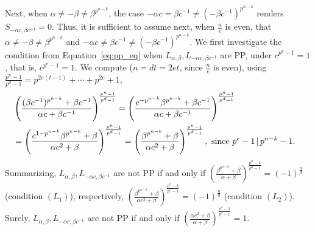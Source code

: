\documentclass[11pt]{article}
\def\\{\cr}
\begin{document}
Next, when $\alpha\neq -\beta\neq \beta^{p^{n-k}}$, the case $-\alpha c=\beta c^{-1}\neq (-\beta c^{-1})^{p^{n-k}}$ renders $S_{-\alpha c,\beta c^{-1}} =0$. Thus, it is sufficient to assume next, when $\frac{n}{e}$ is even, that $\alpha\neq -\beta\neq \beta^{p^{n-k}}$ and $-\alpha c\neq \beta c^{-1}\neq (-\beta c^{-1})^{p^{n-k}}$.
We first investigate the condition from Equation~\eqref{eq:pp_eq} when $L_{\alpha,\beta}, L_{-\alpha c,\beta c^{-1}}$ are PP, under $c^{p^k-1}=1$, that is, $c^{p^e-1}=1$.
We compute ($n=dt=2et$, since $\frac{n}{e}$ is even), using $\frac{p^n-1}{p^d-1}=p^{2e(t-1)}+\cdots+p^{2e}+1$,
\begin{align*}
&\left(\frac{(\beta c^{-1})^{p^{n-k}} +\beta c^{-1}}{\alpha c+\beta c^{-1}}  \right)^{\frac{p^n-1}{p^d-1}}
=\left(\frac{ c^{-p^{n-k}} \beta^{p^{n-k}} +\beta c^{-1}}{\alpha c+\beta c^{-1}}  \right)^{\frac{p^n-1}{p^d-1}}\\
&=\left(\frac{ c^{1-p^{n-k}} \beta^{p^{n-k}} +\beta }{\alpha c^2+\beta }  \right)^{\frac{p^n-1}{p^d-1}}
= \left(\frac{ \beta^{p^{n-k}} +\beta }{\alpha c^2+\beta }  \right)^{\frac{p^n-1}{p^d-1}},\text{ since } p^e-1\,|\,p^{n-k}-1.
\end{align*}
Summarizing, $L_{\alpha,\beta},L_{-\alpha c,\beta c^{-1}}$ are not PP if and only if  $\left(\frac{ \beta^{p^{n-k}} +\beta }{\alpha +\beta }  \right)^{\frac{p^n-1}{p^d-1}}=(-1)^{\frac{n}{d}}$ (condition $(L_1)$), respectively,  $\left(\frac{ \beta^{p^{n-k}} +\beta }{\alpha c^2+\beta }  \right)^{\frac{p^n-1}{p^d-1}}=(-1)^{\frac{n}{d}}$ (condition $(L_2)$). 
Surely, $L_{\alpha,\beta}, L_{-\alpha c,\beta c^{-1}}$ are not PP if and only if $\left(\frac{\alpha c^2+\beta}{\alpha+\beta} \right)^{\frac{p^n-1}{p^d-1}}=1$.
\end{document}
